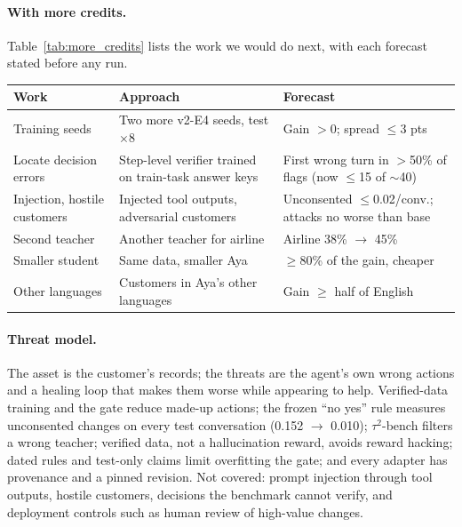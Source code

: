 \documentclass[11pt]{article}
\begin{document}
\paragraph{With more credits.} Table~\ref{tab:more_credits} lists the work we would do next, with each forecast stated before any run.

\par\smallskip\noindent
{\centering\footnotesize\setlength{\tabcolsep}{3pt}%
\begin{tabular}{@{}>{\raggedright\arraybackslash}p{1.9cm}>{\raggedright\arraybackslash}p{2.6cm}>{\raggedright\arraybackslash}p{2.6cm}@{}}
\toprule
\textbf{Work} & \textbf{Approach} & \textbf{Forecast} \\
\midrule
Training seeds & Two more v2-E4 seeds, test $\times$8 & Gain $>0$; spread $\le$3 pts \\
Locate decision errors & Step-level verifier trained on train-task answer keys & First wrong turn in $>$50\% of flags (now $\le$15 of $\sim$40) \\
Injection, hostile customers & Injected tool outputs, adversarial customers & Unconsented $\le$0.02/conv.; attacks no worse than base \\
Second teacher & Another teacher for airline & Airline 38\% $\rightarrow$ 45\% \\
Smaller student & Same data, smaller Aya & $\ge$80\% of the gain, cheaper \\
Other languages & Customers in Aya's other languages & Gain $\ge$ half of English \\
\bottomrule
\end{tabular}
\label{tab:more_credits}\par}
\smallskip

\paragraph{Threat model.} The asset is the customer's records; the threats are the agent's own wrong actions and a healing loop that makes them worse while appearing to help. Verified-data training and the gate reduce made-up actions; the frozen ``no yes'' rule measures unconsented changes on every test conversation (0.152 $\rightarrow$ 0.010); $\tau^2$-bench filters a wrong teacher; verified data, not a hallucination reward, avoids reward hacking; dated rules and test-only claims limit overfitting the gate; and every adapter has provenance and a pinned revision. Not covered: prompt injection through tool outputs, hostile customers, decisions the benchmark cannot verify, and deployment controls such as human review of high-value changes.
\end{document}
